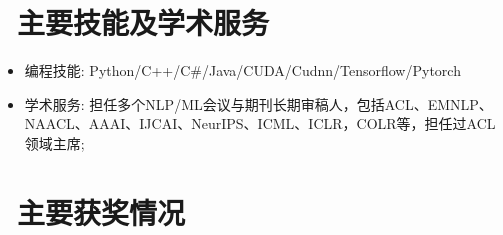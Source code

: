 \documentclass{resume}
\begin{document}
\section{\faCogs\ 主要技能及学术服务}
\begin{itemize}
  \item 编程技能: Python/C++/C\#/Java/CUDA/Cudnn/Tensorflow/Pytorch
  \item 学术服务: 担任多个NLP/ML会议与期刊长期审稿人，包括ACL、EMNLP、NAACL、AAAI、IJCAI、NeurIPS、ICML、ICLR，COLR等，担任过ACL领域主席;
\end{itemize}

\section{\faHeartO\ 主要获奖情况}

%
%
\end{document}
